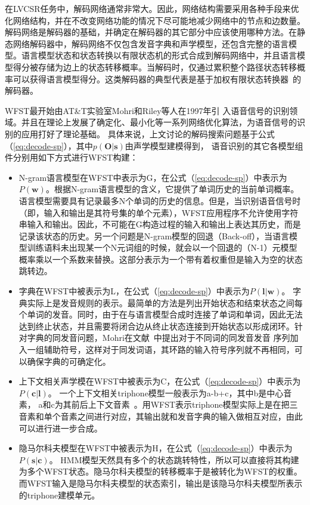 在LVCSR任务中，解码网络通常非常大。因此，网络结构需要采用各种手段来优化网络结构，并在不改变网络功能的情况下尽可能地减少网络中的节点和边数量。解码网络是解码器的基础，并确定在解码器的其它部分中应该使用哪种方法。在静态网络解码器中，解码网络不仅包含发音字典和声学模型，还包含完整的语言模型。语言模型状态和状态转换以有限状态机的形式合成到解码网络中，并且语言模型得分被存储为边上的状态转移概率。当解码时，仅通过累积整个路径状态转移概率可以获得语言模型得分。这类解码器的典型代表是基于加权有限状态转换器~\cite{mohri2002weighted}的解码器。

WFST最开始由AT\&T实验室Mohri和Riley等人在1997年引
入语音信号的识别领域。并且在理论上发展了确定化、最小化等一系列网络优化算法，为语音信号的识别的应用打好了理论基础。
具体来说，上文讨论的解码搜索问题基于公式（\ref{eq:decode-sp}），其中$p(\mathbf{O}|\mathbf{s})$由声学模型建模得到，
语音识别的其它各模型组件分别用如下方式进行WFST构建：

\begin{itemize}
\item N-gram语言模型在WFST中表示为G，在公式（\ref{eq:decode-sp}）中表示为$P(\mathbf{w})$。根据N-gram语言模型的含义，它提供了单词历史的当前单词概率。语言模型需要具有记录最多N个单词的历史的信息。但是，当识别语音信号时（即，输入和输出是其符号集的单个元素），WFST应用程序不允许使用字符串输入和输出。因此，不可能在G构造过程的输入和输出上表达其历史，而是记录该状态的历史。另一个问题是N-gram模型的回退（Back-off），当语言模型训练语料未出现某一个N元词组的时候，就会以一个回退的（N-1）元模型概率乘以一个系数来替换。这部分表示为一个带有着权重但是输入为空的状态跳转边。

\item 字典在WFST中被表示为L，在公式（\ref{eq:decode-sp}）中表示为$P(\mathbf{l}|\mathbf{w})$。
字典实际上是发音规则的表示。最简单的方法是列出开始状态和结束状态之间每个单词的发音。同时，由于在与语言模型合成时连接了单词和单词，因此无法达到终止状态，并且需要将闭合边从终止状态连接到开始状态以形成闭环。针对字典的同发音问题，Mohri在文献~\cite{mohri2002weighted}中提出对于不同词的同发音发音
序列加入一组辅助符号，这样对于同发词语，其环路的输入符号序列就不再相同，可以确保字典的可确定化。

\item 上下文相关声学模在WFST中被表示为C，在公式（\ref{eq:decode-sp}）中表示为$P(\mathbf{c}|\mathbf{l})$。
一个上下文相关triphone模型一般表示为a-b+c，其中b是中心音素，
a和c为其前后上下文音素~\cite{seide2011conversational}。用WFST表示triphone模型实际上是在把三音素和单个音素之间进行对应，其输出就和发音字典的输入做相互对应，由此可以进行进一步合成。

\item 隐马尔科夫模型在WFST中被表示为H，在公式（\ref{eq:decode-sp}）中表示为$P(\mathbf{s}|\mathbf{c})$。
HMM模型天然具有多个的状态跳转特性，所以可以直接将其构建为多个WFST状态。隐马尔科夫模型的转移概率于是被转化为WFST的权重。而WFST输入是隐马尔科夫模型的状态索引，输出是该隐马尔科夫模型所表示的triphone建模单元。
\end{itemize}

